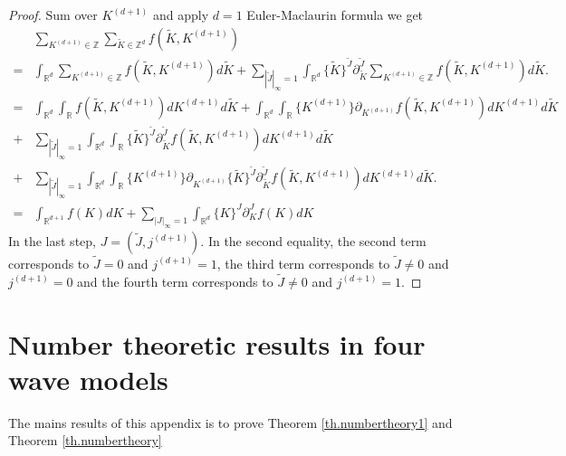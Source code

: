 \begin{proof}
Sum over $K^{(d+1)}$ and apply $d=1$ Euler-Maclaurin formula we get
\begin{equation}
\begin{split}
    &\sum_{K^{(d+1)}\in\mathbb{Z}}\sum_{\widetilde{K}\in\mathbb{Z}^d} f(\widetilde{K},K^{(d+1)})
    \\
    =&\int_{\mathbb{R}^d} \sum_{K^{(d+1)}\in\mathbb{Z}}f(\widetilde{K},K^{(d+1)})d\widetilde{K}+\sum_{ |\widetilde{J}|_{\infty} = 1}\int_{\mathbb{R}^d} \{\widetilde{K}\}^{\widetilde{J}} \partial_{\widetilde{K}}^{\widetilde{J}}\sum_{K^{(d+1)}\in\mathbb{Z}}f(\widetilde{K},K^{(d+1)}) d\widetilde{K}.
    \\
    =&\int_{\mathbb{R}^d} \int_{\mathbb{R}}f(\widetilde{K},K^{(d+1)})dK^{(d+1)} d\widetilde{K}+\int_{\mathbb{R}^d} \int_{\mathbb{R}}\{K^{(d+1)}\}\partial_{K^{(d+1)}}f(\widetilde{K},K^{(d+1)})dK^{(d+1)} d\widetilde{K}
    \\
    +&\sum_{ |\widetilde{J}|_{\infty} = 1}\int_{\mathbb{R}^d}\int_{\mathbb{R}} \{\widetilde{K}\}^{\widetilde{J}} \partial_{\widetilde{K}}^{\widetilde{J}}f(\widetilde{K},K^{(d+1)})dK^{(d+1)} d\widetilde{K}
    \\
    +&\sum_{ |\widetilde{J}|_{\infty} = 1}\int_{\mathbb{R}^d}\int_{\mathbb{R}}\{K^{(d+1)}\}\partial_{K^{(d+1)}} \{\widetilde{K}\}^{\widetilde{J}} \partial_{\widetilde{K}}^{\widetilde{J}}f(\widetilde{K},K^{(d+1)})dK^{(d+1)} d\widetilde{K}.
    \\
    =&\int_{\mathbb{R}^{d+1}} f(K)dK + \sum_{ |J|_{\infty} = 1}\int_{\mathbb{R}^d} \{K\}^{J} \partial_K^{J}f(K) dK
\end{split}
\end{equation}
In the last step, $J=(\widetilde{J},j^{(d+1)})$. In the second equality, the second term corresponds to $\widetilde{J}=0$ and $j^{(d+1)}=1$, the third term corresponds to $\widetilde{J}\ne 0$ and $j^{(d+1)}=0$ and the fourth term corresponds to $\widetilde{J}\ne 0$ and $j^{(d+1)}=1$.
\end{proof}


\section{Number theoretic results in four wave models}

The mains results of this appendix is to prove Theorem \ref{th.numbertheory1} and Theorem \ref{th.numbertheory} 

